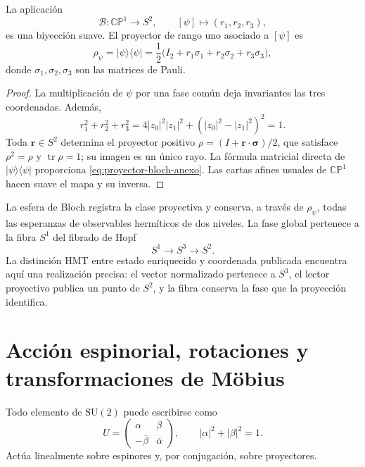 \begin{theorem}
\label{thm:CP1-esfera-bloch-anexo}
La aplicación
\begin{equation}
 \mathcal B:\mathbb{CP}^{1}\longrightarrow S^2,
 \qquad [\psi]\longmapsto(r_1,r_2,r_3),
 \label{eq:mapa-bloch-anexo}
\end{equation}
es una biyección suave. El proyector de rango uno asociado a \([\psi]\) es
\begin{equation}
 \rho_\psi=|\psi\rangle\langle\psi|
 =\frac12\bigl(I_2+r_1\sigma_1+r_2\sigma_2+r_3\sigma_3\bigr),
 \label{eq:proyector-bloch-anexo}
\end{equation}
donde \(\sigma_1,\sigma_2,\sigma_3\) son las matrices de Pauli.
\end{theorem}

\begin{proof}
La multiplicación de \(\psi\) por una fase común deja invariantes las tres
coordenadas. Además,
\[
 r_1^2+r_2^2+r_3^2
 =4|z_0|^2|z_1|^2+(|z_0|^2-|z_1|^2)^2=1.
\]
Toda \(\boldsymbol r\in S^2\) determina el proyector positivo
\(\rho=(I+\boldsymbol r\cdot\boldsymbol\sigma)/2\), que satisface
\(\rho^2=\rho\) y \(\operatorname{tr}\rho=1\); su imagen es un único rayo.
La fórmula matricial directa de \(|\psi\rangle\langle\psi|\) proporciona
\eqref{eq:proyector-bloch-anexo}. Las cartas afines usuales de
\(\mathbb{CP}^{1}\) hacen suave el mapa y su inversa.
\end{proof}

La esfera de Bloch registra la clase proyectiva y conserva, a través de
\(\rho_\psi\), todas las esperanzas de observables hermíticos de dos niveles.
La fase global pertenece a la fibra \(S^1\) del fibrado de Hopf
\cite{Hopf1931}
\begin{equation}
 S^1\longrightarrow S^3\longrightarrow S^2.
 \label{eq:hopf-bloch-anexo}
\end{equation}
La distinción HMT entre estado enriquecido y coordenada publicada encuentra
aquí una realización precisa: el vector normalizado pertenece a \(S^3\), el
lector proyectivo publica un punto de \(S^2\), y la fibra conserva la fase que
la proyección identifica.

\section{Acción espinorial, rotaciones y transformaciones de Möbius}

Todo elemento de \(\mathrm{SU}(2)\) puede escribirse como
\begin{equation}
 U=
 \begin{pmatrix}
 \alpha&\beta\\
 -\overline\beta&\overline\alpha
 \end{pmatrix},
 \qquad |\alpha|^2+|\beta|^2=1.
 \label{eq:SU2-parametrizacion-anexo}
\end{equation}
Actúa linealmente sobre espinores y, por conjugación, sobre proyectores.

